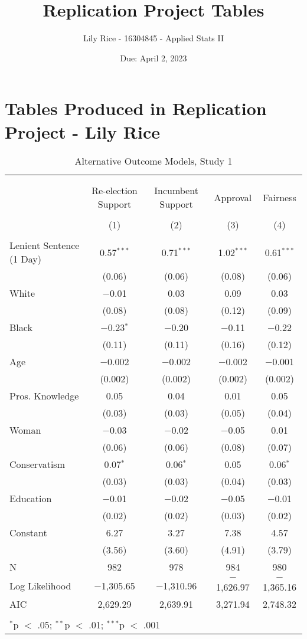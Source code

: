 \documentclass[12pt,letterpaper]{article}
\title{Replication Project Tables}
\date{Due: April 2, 2023}
\author{Lily Rice - 16304845 - Applied Stats II}
\begin{document}
	\maketitle
	\section*{Tables Produced in Replication Project - Lily Rice}

\begin{table}[!htbp] \centering   \caption{Alternative Outcome Models, Study 1}   \label{} \begin{tabular}{@{\extracolsep{5pt}}lcccc} \\[-1.8ex]\hline \\[-1.8ex] \\[-1.8ex] & Re-election Support & Incumbent Support & Approval & Fairness \\ \\[-1.8ex] & (1) & (2) & (3) & (4)\\ \hline \\[-1.8ex]  Lenient Sentence (1 Day) & 0.57$^{***}$ & 0.71$^{***}$ & 1.02$^{***}$ & 0.61$^{***}$ \\   & (0.06) & (0.06) & (0.08) & (0.06) \\   White & $-$0.01 & 0.03 & 0.09 & 0.03 \\   & (0.08) & (0.08) & (0.12) & (0.09) \\   Black & $-$0.23$^{*}$ & $-$0.20 & $-$0.11 & $-$0.22 \\   & (0.11) & (0.11) & (0.16) & (0.12) \\   Age & $-$0.002 & $-$0.002 & $-$0.002 & $-$0.001 \\   & (0.002) & (0.002) & (0.002) & (0.002) \\   Pros. Knowledge & 0.05 & 0.04 & 0.01 & 0.05 \\   & (0.03) & (0.03) & (0.05) & (0.04) \\   Woman & $-$0.03 & $-$0.02 & $-$0.05 & 0.01 \\   & (0.06) & (0.06) & (0.08) & (0.07) \\   Conservatism & 0.07$^{*}$ & 0.06$^{*}$ & 0.05 & 0.06$^{*}$ \\   & (0.03) & (0.03) & (0.04) & (0.03) \\   Education & $-$0.01 & $-$0.02 & $-$0.05 & $-$0.01 \\   & (0.02) & (0.02) & (0.03) & (0.02) \\   Constant & 6.27 & 3.27 & 7.38 & 4.57 \\   & (3.56) & (3.60) & (4.91) & (3.79) \\  N & 982 & 978 & 984 & 980 \\ Log Likelihood & $-$1,305.65 & $-$1,310.96 & $-$1,626.97 & $-$1,365.16 \\ AIC & 2,629.29 & 2,639.91 & 3,271.94 & 2,748.32 \\ \hline \\[-1.8ex] \multicolumn{5}{l}{$^{*}$p $<$ .05; $^{**}$p $<$ .01; $^{***}$p $<$ .001} \\ \end{tabular} \end{table} 


	
\end{document}
